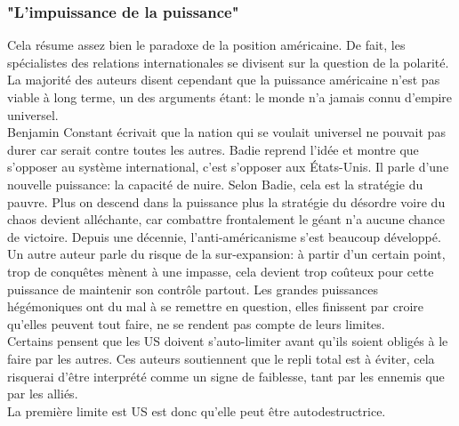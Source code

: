 \documentclass[10pt, a4paper, openany]{book}
\begin{document}
\subsubsection{"L'impuissance de la puissance"}

Cela résume assez bien le paradoxe de la position américaine. De fait, les spécialistes des relations internationales se divisent sur la question de la polarité. La majorité des auteurs disent cependant que la puissance américaine n'est pas viable à long terme, un des arguments étant: le monde n'a jamais connu d'empire universel. \\
Benjamin Constant écrivait que la nation qui se voulait universel ne pouvait pas durer car serait contre toutes les autres. Badie reprend l'idée et montre que s'opposer au système international, c'est s'opposer aux États-Unis. Il parle d'une nouvelle puissance: la capacité de nuire. Selon Badie, cela est la stratégie du pauvre. Plus on descend dans la puissance plus la stratégie du désordre voire du chaos devient alléchante, car combattre frontalement le géant n'a aucune chance de victoire. Depuis une décennie, l'anti-américanisme s'est beaucoup développé. \\
Un autre auteur parle du risque de la sur-expansion: à partir d'un certain point, trop de conquêtes mènent à une impasse, cela devient trop coûteux pour cette puissance de maintenir son contrôle partout. Les grandes puissances hégémoniques ont du mal à se remettre en question, elles finissent par croire qu'elles peuvent tout faire, ne se rendent pas compte de leurs limites. \\
Certains pensent que les US doivent s'auto-limiter avant qu'ils soient obligés à le faire par les autres. Ces auteurs soutiennent que le repli total est à éviter, cela risquerai d'être interprété comme un signe de faiblesse, tant par les ennemis que par les alliés. \\
La première limite est US est donc qu'elle peut être autodestructrice. 
\end{document}
